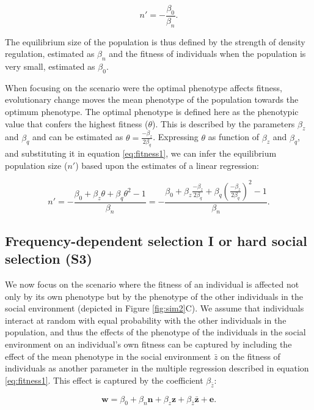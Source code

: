 \documentclass{article}
\begin{document}
\begin{equation}\label{eq:equilibrium}
n'=-\frac{\beta_{0}}{\beta_n}. 
\end{equation} 

\noindent The equilibrium size of the population is thus defined by the strength of density regulation, estimated as $\beta_n$ and the fitness of individuals when the population is very small, estimated as $\beta_0$. 

When focusing on the scenario were the optimal phenotype affects fitness, evolutionary change moves the mean phenotype of the population towards the optimum phenotype. The optimal phenotype is defined here as the phenotypic value that confers the highest fitness ($\theta$). This is described by the parameters $\beta_{z}$ and $\beta_{q}$ and can be estimated as $\theta=\frac{-\beta_{z}}{2\beta_{q}}$. Expressing $\theta$ as function of $\beta_{z}$ and $\beta_{q}$, and substituting it in equation \ref{eq:fitness1}, we can infer the equilibrium population size ($n'$) based upon the estimates of a linear regression:

\begin{equation}\label{eq:equilibrium1}
n'=-\frac{\beta_{0}+ \beta_{z}\theta + \beta_{q}\theta^2-1}{\beta_n} = -\frac{\beta_{0}+ \beta_{z}\frac{-\beta_{z}}{2\beta_{q}} + \beta_{q}(\frac{-\beta_{z}}{2\beta_{q}})^2-1}{\beta_n}. 
\end{equation}


\subsection{Frequency-dependent selection I or hard social selection (S3)}

We now focus on the scenario where the fitness of an individual is affected not only by its own phenotype but by the phenotype of the other individuals in the social environment (depicted in Figure \ref{fig:sim2}C). We assume that individuals interact at random with equal probability with the other individuals in the population, and thus the effects of the phenotype of the individuals in the social environment on an individual's own fitness can be captured by including the effect of the mean phenotype in the social environment $\bar{z}$ on the fitness of individuals as another parameter in the multiple regression described in equation \ref{eq:fitness1}. This effect is captured by the coefficient $\beta_{\bar{z}}$:  

\begin{equation} \label{eq: socialselection}
\mathbf{w}=\beta_{0} +\beta_{n} \mathbf{n} + \beta_{z} \mathbf{z}+ \beta_{\bar{z}} \bar{\mathbf{z}}+ \mathbf{e}.
\end{equation}
 
\end{document}
